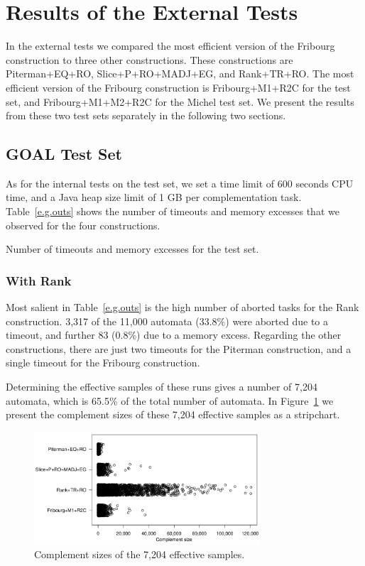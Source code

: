 \section{Results of the External Tests}
\label{5_external}
In the external tests we compared the most efficient version of the Fribourg construction to three other constructions. These constructions are Piterman+EQ+RO, Slice+P+RO+MADJ+EG, and Rank+TR+RO. The most efficient version of the Fribourg construction is Fribourg+M1+R2C for the \goal{} test set, and Fribourg+M1+M2+R2C for the Michel test set. We present the results from these two test sets separately in the following two sections.


\subsection{GOAL Test Set}
\label{5_external_goal}
As for the internal tests on the \goal{} test set, we set a time limit of 600 seconds CPU time, and a Java heap size limit of 1 GB per complementation task.  Table~\ref{e.g.outs} shows the number of timeouts and memory excesses that we observed for the four constructions.

\begin{table}[ht]
\centering

\caption{Number of timeouts and memory excesses for the \goal{} test set.}
\label{e.g.outs}
\end{table}

\subsubsection{With Rank}

Most salient in Table~\ref{e.g.outs} is the high number of aborted tasks for the Rank construction. 3,317 of the 11,000 automata (33.8\%) were aborted due to a timeout, and further 83 (0.8\%) due to a memory excess. Regarding the other constructions, there are just two timeouts for the Piterman construction, and a single timeout for the Fribourg construction.

Determining the effective samples of these runs gives a number of 7,204 automata, which is 65.5\% of the total number of automata. In Figure~\ref{e.g.stripchart.with_rank} we present the complement sizes of these 7,204 effective samples as a stripchart. 

\begin{figure}[ht]
\centering
\includegraphics[width=0.75\textwidth]{figures/r/external/goal/s.stripchart.with_rank.pdf}
\caption{Complement sizes of the 7,204 effective samples.}
\label{e.g.stripchart.with_rank}
\end{figure}

